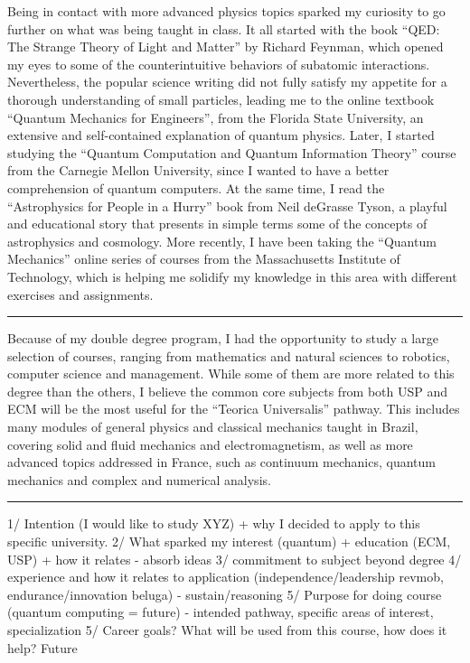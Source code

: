 \documentclass[11pt]{article}
\newcommand*{\NEWLINE}{\vspace{0.75em}}
\begin{document}
Being in contact with more advanced physics topics sparked my curiosity to go further on what was being taught in class. It all started with the book ``QED: The Strange Theory of Light and Matter'' by Richard Feynman, which opened my eyes to some of the counterintuitive behaviors of subatomic interactions. Nevertheless, the popular science writing did not fully satisfy my appetite for a thorough understanding of small particles, leading me to the online textbook ``Quantum Mechanics for Engineers'', from the Florida State University, an extensive and self-contained explanation of quantum physics. Later, I started studying the ``Quantum Computation and Quantum Information Theory'' course from the Carnegie Mellon University, since I wanted to have a better comprehension of quantum computers. At the same time, I read the ``Astrophysics for People in a Hurry'' book from Neil deGrasse Tyson, a playful and educational story that presents in simple terms some of the concepts of astrophysics and cosmology. More recently, I have been taking the ``Quantum Mechanics'' online series of courses from the Massachusetts Institute of Technology, which is helping me solidify my knowledge in this area with different exercises and assignments.
\NEWLINE{}

\noindent\rule{\textwidth}{1pt}

Because of my double degree program, I had the opportunity to study a large selection of courses, ranging from mathematics and natural sciences to robotics, computer science and management. While some of them are more related to this degree than the others, I believe the common core subjects from both USP and ECM will be the most useful for the “Teorica Universalis” pathway. This includes many modules of general physics and classical mechanics taught in Brazil, covering solid and fluid mechanics and electromagnetism, as well as more advanced topics addressed in France, such as continuum mechanics, quantum mechanics and complex and numerical analysis. 

\noindent\rule{\textwidth}{1pt}

1/ Intention (I would like to study XYZ) + why I decided to apply to this
specific university.
2/ What sparked my interest (quantum) + education (ECM, USP) + how it relates - absorb ideas
3/ commitment to subject beyond degree
4/ experience and how it relates to application (independence/leadership revmob, endurance/innovation beluga) - sustain/reasoning
5/ Purpose for doing course (quantum computing = future) - intended pathway, specific areas of interest, specialization
5/ Career goals? What will be used from this course, how does it help? Future
\end{document}
